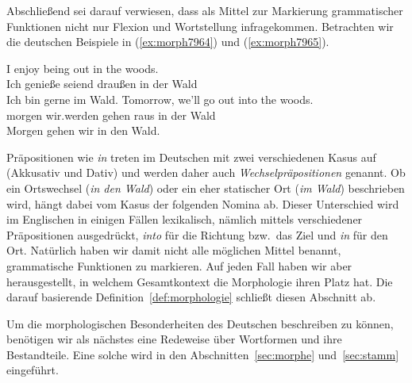 Abschließend sei darauf verwiesen, dass als Mittel zur Markierung grammatischer Funktionen nicht nur Flexion und Wortstellung infragekommen.
Betrachten wir die deutschen Beispiele in (\ref{ex:morph7964}) und (\ref{ex:morph7965}).

\begin{exe}
  \ex \label{ex:morph7964}
  \begin{xlist}
  \end{xlist}
  \ex \label{ex:morph7965}
  \begin{xlist}
    \ex\gll I enjoy being out in the woods.\\
    Ich genieße seiend draußen in der Wald\\
    \glt Ich bin gerne im Wald.
    \ex\gll Tomorrow, {we'll} go out into the woods.\\
    morgen {wir.werden} gehen raus in der Wald\\
    \glt Morgen gehen wir in den Wald.
  \end{xlist}
\end{exe}


Präpositionen wie \textit{in} treten im Deutschen mit zwei verschiedenen Kasus auf (Akkusativ und Dativ) und werden daher auch \textit{Wechselpräpositionen} genannt.
Ob ein Ortswechsel (\textit{in den Wald}) oder ein eher statischer Ort (\textit{im Wald}) beschrieben wird, hängt dabei vom Kasus der folgenden Nomina ab.
Dieser Unterschied wird \zB im Englischen in einigen Fällen lexikalisch, nämlich mittels verschiedener Präpositionen ausgedrückt, \textit{into} für die Richtung bzw.\ das Ziel und \textit{in} für den Ort.
Natürlich haben wir damit nicht alle möglichen Mittel benannt, grammatische Funktionen zu markieren.
Auf jeden Fall haben wir aber herausgestellt, in welchem Gesamtkontext die Morphologie ihren Platz hat.
Die darauf basierende Definition~\ref{def:morphologie} schließt diesen Abschnitt ab.


Um die morphologischen Besonderheiten des Deutschen beschreiben zu können, benötigen wir als nächstes eine Redeweise über Wortformen und ihre Bestandteile.
Eine solche wird in den Abschnitten~\ref{sec:morphe} und~\ref{sec:stamm} eingeführt.

